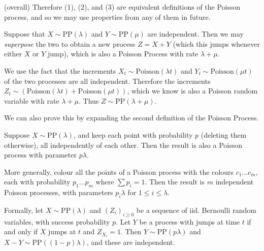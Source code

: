 \documentclass{article}
\begin{document}
\begin{prf}
    (overall) Therefore (1), (2), and (3) are equivalent definitions of the Poisson process, and so we may use properties from any of them in future.
\end{prf}

\begin{theorem}
    Suppose that $X \sim \mathrm{PP} (\lambda)$ and $Y \sim \mathrm{PP} (\mu)$ are independent. Then we may \textit{superpose} the two to obtain a new process $Z = X + Y$ (which this jumps whenever either $X$ or $Y$ jump), which is also a Poisson Process with rate $\lambda + \mu$.
\end{theorem}
\begin{prf}
    We use the fact that the increments $X_t \sim \mathrm{Poisson}(\lambda t)$ and $Y_t \sim \mathrm{Poisson}(\mu t)$ of the two processes are all independent. Therefore the increments $Z_t \sim (\mathrm{Poisson}(\lambda t) + \mathrm{Poisson}(\mu t))$, which we know is also a Poisson random variable with rate $\lambda + \mu$. Thus $Z \sim \mathrm{PP}(\lambda + \mu)$.
\end{prf}

\begin{note}
	We can also prove this by expanding the second definition of the Poisson Process.
\end{note}

\begin{theorem}
    Suppose $X \sim \mathrm{PP} (\lambda)$, and keep each point with probability $p$ (deleting them otherwise), all independently of each other. Then the result is also a Poisson process with parameter $p \lambda$.
    
    More generally, colour all the points of a Poisson process with the colours $c_1 \dots c_m$, each with probability $p_1 \dots p_m$ where $\sum p_i = 1$. Then the result is $m$ independent Poisson processes, with parameters $p_i\lambda$ for $1 \leq i \leq \lambda$.
    
    Formally, let $X \sim \mathrm{PP} (\lambda)$ and $(Z_i)_{i \geq 0}$ be a sequence of iid. Bernoulli random variables, with success probability $p$. Let $Y$ be a process with jumps at time $t$ if and only if $X$ jumps at $t$ and $Z_{X_i} = 1$. Then $Y \sim \mathrm{PP} (p\lambda)$ and $X-Y \sim \mathrm{PP} ((1-p)\lambda)$, and these are  independent.
\end{theorem}
\end{document}
